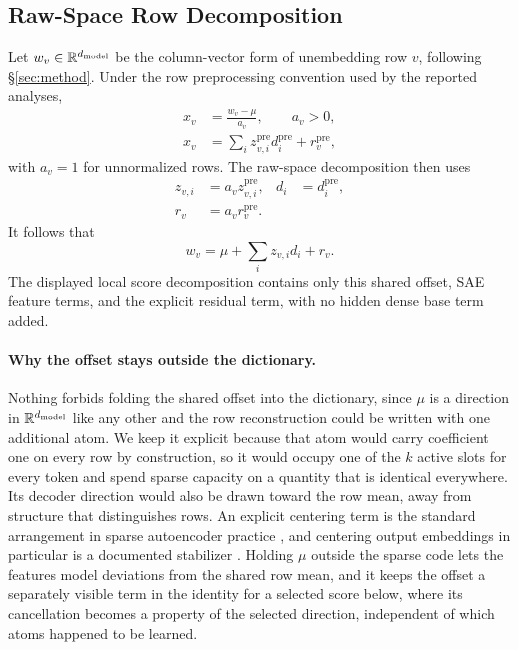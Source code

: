 \subsection{Raw-Space Row Decomposition}
\label{app:score-decomposition-row-factorization}

Let \(w_v\in\mathbb{R}^{d_{\mathrm{model}}}\) be the column-vector form of
unembedding row \(v\), following \S\ref{sec:method}. Under the row
preprocessing convention used by the reported analyses,
\[
    \begin{aligned}
    x_v&=\frac{w_v-\mu}{a_v}, \qquad a_v>0,\\
    x_v&=\sum_i z^{\mathrm{pre}}_{v,i}d^{\mathrm{pre}}_i+r^{\mathrm{pre}}_v,
    \end{aligned}
\]
with \(a_v=1\) for unnormalized rows. The raw-space decomposition then uses
\[
\begin{aligned}
    z_{v,i}&=a_v z^{\mathrm{pre}}_{v,i},
    & d_i&=d^{\mathrm{pre}}_i,\\
    r_v&=a_v r^{\mathrm{pre}}_v.
\end{aligned}
\]
It follows that
\[
    w_v=\mu+\sum_i z_{v,i}d_i+r_v .
\]
The displayed local score decomposition contains only this shared offset, SAE feature
terms, and the explicit residual term, with no hidden dense base term added.

\paragraph{Why the offset stays outside the dictionary.}
Nothing forbids folding the shared offset into the dictionary, since
\(\mu\) is a direction in \(\mathbb{R}^{d_{\mathrm{model}}}\) like any other and the row
reconstruction could be written with one additional atom. We keep it
explicit because that atom would carry coefficient one on every row by
construction, so it would occupy one of the \(k\) active slots for every
token and spend sparse capacity on a quantity that is identical
everywhere. Its decoder direction would also be drawn toward the row mean,
away from structure that distinguishes rows. An explicit
centering term is the standard arrangement in sparse autoencoder practice
\citep{bricken2023monosemanticity,gao2024scaling}, and centering output
embeddings in particular is a documented stabilizer
\citep{stollenwerk2026output}. Holding \(\mu\) outside the sparse code
lets the features model deviations from the shared row mean, and it keeps
the offset a separately visible term in the identity for a selected score below,
where its cancellation becomes a property of the selected direction,
independent of which atoms happened to be learned.

